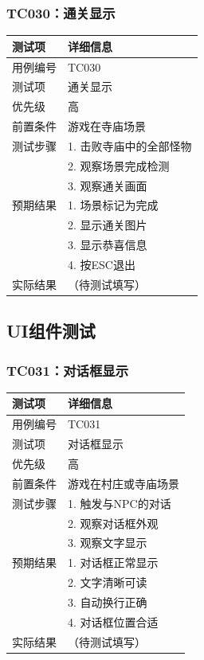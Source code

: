 \documentclass[a4paper,12pt]{article}
\begin{document}
\subsubsection{TC030：通关显示}
\begin{table}[h]
\centering
\begin{tabular}{ll}
\toprule
测试项 & 详细信息 \\
\midrule
用例编号 & TC030 \\
测试项 & 通关显示 \\
优先级 & 高 \\
前置条件 & 游戏在寺庙场景 \\
测试步骤 & 1. 击败寺庙中的全部怪物 \\
 & 2. 观察场景完成检测 \\
 & 3. 观察通关画面 \\
预期结果 & 1. 场景标记为完成 \\
 & 2. 显示通关图片 \\
 & 3. 显示恭喜信息 \\
 & 4. 按ESC退出 \\
实际结果 & （待测试填写） \\
\bottomrule
\end{tabular}
\end{table}

\subsection{UI组件测试}

\subsubsection{TC031：对话框显示}
\begin{table}[h]
\centering
\begin{tabular}{ll}
\toprule
测试项 & 详细信息 \\
\midrule
用例编号 & TC031 \\
测试项 & 对话框显示 \\
优先级 & 高 \\
前置条件 & 游戏在村庄或寺庙场景 \\
测试步骤 & 1. 触发与NPC的对话 \\
 & 2. 观察对话框外观 \\
 & 3. 观察文字显示 \\
预期结果 & 1. 对话框正常显示 \\
 & 2. 文字清晰可读 \\
 & 3. 自动换行正确 \\
 & 4. 对话框位置合适 \\
实际结果 & （待测试填写） \\
\bottomrule
\end{tabular}
\end{table}
\end{document}
